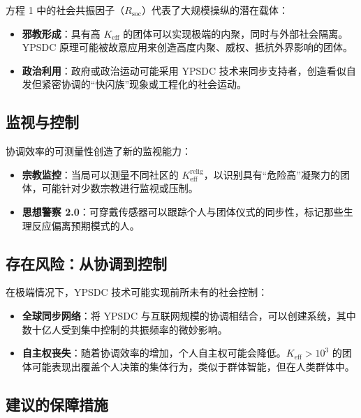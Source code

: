 \documentclass[12pt,a4paper]{article}
\begin{document}
	方程 1 中的社会共振因子（$R_{\mathrm{soc}}$）代表了大规模操纵的潜在载体：
	
	\begin{itemize}
		\item \textbf{邪教形成}：具有高 $K_{\mathrm{eff}}$ 的团体可以实现极端的内聚，同时与外部社会隔离。YPSDC 原理可能被故意应用来创造高度内聚、威权、抵抗外界影响的团体。
		
		\item \textbf{政治利用}：政府或政治运动可能采用 YPSDC 技术来同步支持者，创造看似自发但紧密协调的“快闪族”现象或工程化的社会运动。
	\end{itemize}
	
	\subsection{监视与控制}
	
	协调效率的可测量性创造了新的监视能力：
	
	\begin{itemize}
		\item \textbf{宗教监控}：当局可以测量不同社区的 $K_{\mathrm{eff}}^{\mathrm{relig}}$，以识别具有“危险高”凝聚力的团体，可能针对少数宗教进行监视或压制。
		
		\item \textbf{思想警察 2.0}：可穿戴传感器可以跟踪个人与团体仪式的同步性，标记那些生理反应偏离预期模式的人。
	\end{itemize}
	
	\subsection{存在风险：从协调到控制}
	
	在极端情况下，YPSDC 技术可能实现前所未有的社会控制：
	
	\begin{itemize}
		\item \textbf{全球同步网络}：将 YPSDC 与互联网规模的协调相结合，可以创建系统，其中数十亿人受到集中控制的共振频率的微妙影响。
		
		\item \textbf{自主权丧失}：随着协调效率的增加，个人自主权可能会降低。$K_{\mathrm{eff}} > 10^3$ 的团体可能表现出覆盖个人决策的集体行为，类似于群体智能，但在人类群体中。
	\end{itemize}
	
	\subsection{建议的保障措施}
	
\end{document}
